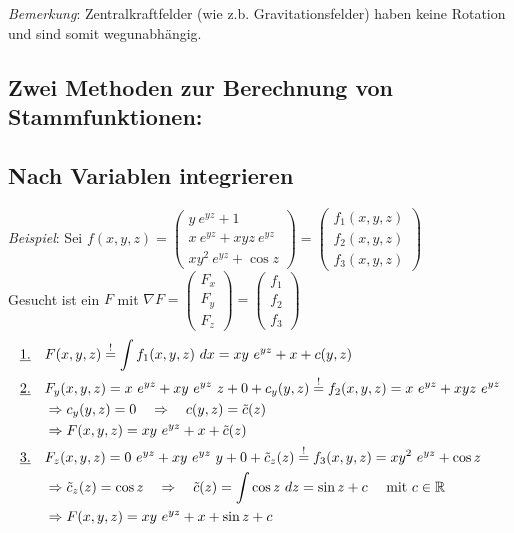 \documentclass[11pt,a4paper]{book}
\newcommand {\R}	{\mathbb{R}}
\newcommand{\1}    	{\mathbbm{1}}
\newcommand{\mitt}	{\textrm{ mit }}
\newcommand{\Bemerkung}	{\noindent\textit{Bemerkung}: }
\begin{document}
\Bemerkung Zentralkraftfelder (wie z.b. Gravitationsfelder) haben keine Rotation und sind somit wegunabhängig.

\subsection*{Zwei Methoden zur Berechnung von Stammfunktionen:}
\subsection{Nach Variablen integrieren}
\textit{Beispiel}: Sei \(f(x,y,z) = \left(\begin{array}{c}
	y~e^{yz} + 1 \\
	x~e^{yz} + xyz~e^{yz} \\
	xy^2~e^{yz} + \cos z
\end{array} \right) = \left( \begin{array}{c}
	f_1(x,y,z) \\
	f_2(x,y,z) \\
	f_3(x,y,z)
\end{array} \right) \)\\
Gesucht ist ein \(F\) mit \(\nabla F = \left( \begin{array}{c}
	F_x \\ F_y \\ F_z
\end{array} \right) = \left( \begin{array}{c}
	f_1 \\ f_2 \\ f_3
\end{array} \right)\)
\begin{align*}
	\textrm{\underline{1.}}\quad & 
	F(x,y,z) \stackrel{!}{=} \int f_1(x,y,z) ~dx = xy~e^{yz} + x + c(y,z) \\
	\textrm{\underline{2.}}\quad & 
	F_y(x,y,z) = x~e^{yz} + xy~e^{yz}~z + 0 + c_y(y,z) \stackrel{!}{=}
	f_2(x,y,z) = x~e^{yz} + xyz~e^{yz} \\
	&\Rightarrow c_y(y,z) = 0 \quad\Rightarrow\quad c(y,z) = \tilde{c}(z) \\
	&\Rightarrow F(x,y,z) = xy~e^{yz} + x + \tilde{c}(z) \\
	\textrm{\underline{3.}}\quad &
	F_z(x,y,z) = 0~e^{yz} + xy~e^{yz}~y + 0 + \tilde{c}_z(z) \stackrel{!}{=}
	f_3(x,y,z) = xy^2~e^{yz} + \cos z \\
	&\Rightarrow \tilde{c}_z(z) = \cos z \quad\Rightarrow\quad
	\tilde{c}(z) = \int \cos z ~dz = \sin z + c \quad\mitt c \in \R \\
	&\Rightarrow F(x,y,z) = xy~e^{yz} + x + \sin z + c
\end{align*}
\end{document}

